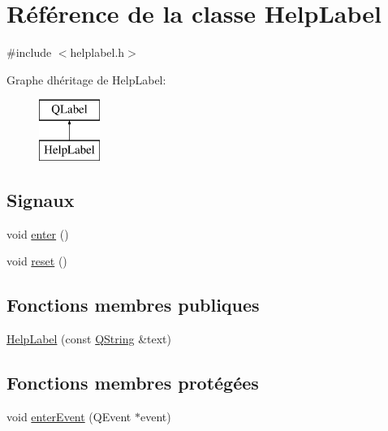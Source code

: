 \hypertarget{class_help_label}{}\section{Référence de la classe Help\+Label}
\label{class_help_label}


{\ttfamily \#include $<$helplabel.\+h$>$}

Graphe d\textquotesingle{}héritage de Help\+Label\+:\begin{figure}[H]
\begin{center}
\leavevmode
\includegraphics[height=2.000000cm]{class_help_label}
\end{center}
\end{figure}
\subsection*{Signaux}
\begin{DoxyCompactItemize}
\item 
void \hyperlink{class_help_label_a0440696e3a2e2eb57655595c49f0515e}{enter} ()
\item 
void \hyperlink{class_help_label_a9a099d149d6189ed6f0f024893915216}{reset} ()
\end{DoxyCompactItemize}
\subsection*{Fonctions membres publiques}
\begin{DoxyCompactItemize}
\item 
\hyperlink{class_help_label_af2e77b1563c15c02a21ba70670818d88}{Help\+Label} (const \hyperlink{class_q_string}{Q\+String} \&text)
\end{DoxyCompactItemize}
\subsection*{Fonctions membres protégées}
\begin{DoxyCompactItemize}
\item 
void \hyperlink{class_help_label_aa5519710ec361b4f9202c04398e814b8}{enter\+Event} (Q\+Event $\ast$event)
\end{DoxyCompactItemize}


